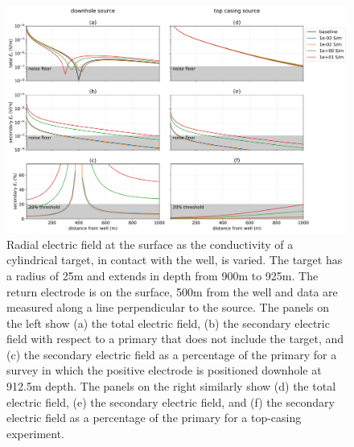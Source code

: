 \begin{figure}
    \begin{center}
    \includegraphics[width=\textwidth]{figures/target_electric_fields.png}
    \end{center}
\caption{
    Radial electric field at the surface as the conductivity of a cylindrical target, in contact with the well,
    is varied. The target has a radius of 25m and extends in depth from 900m to 925m. The return electrode
    is on the surface, 500m from the well and data are measured along a line perpendicular to the source.
    The panels on the left show
    (a) the total electric field, (b) the secondary electric field with respect to a primary that does not include the target,
    and (c) the secondary electric field as a percentage of the primary for a survey in which the positive electrode is
    positioned downhole at 912.5m depth. The panels on the right similarly show (d) the total electric field, (e) the
    secondary electric field, and (f) the secondary electric field as a percentage of the primary for a top-casing experiment.
}
\label{fig:target_electric_fields}
\end{figure}
